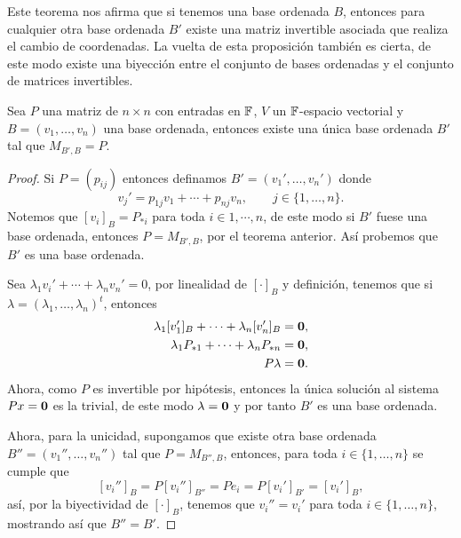 Este teorema nos afirma que si tenemos una base ordenada $B$, entonces para cualquier otra base ordenada $B'$ existe una matriz invertible asociada que realiza el cambio de coordenadas. La vuelta de esta proposición también es cierta, de este modo existe una biyección entre el conjunto de bases ordenadas y el conjunto de matrices invertibles.

\begin{prop}\label{prop:ExBase}
  Sea $P$ una matriz de $n\times n$ con entradas en $\mathbb{F}$, $V$ un $\mathbb{F}$-espacio vectorial y $B = (v_1, \ldots, v_n)$ una base ordenada, entonces existe una única base ordenada $B'$ tal que $M_{B',B} = P$.
\end{prop}
\begin{proof}
  Si $P = (p_{ij})$ entonces definamos $B' = (v_1', \ldots, v_n')$ donde
    \[ v_j' = p_{1j}v_1 + \cdots +  p_{nj}v_n,     \qquad j \in \{1,\ldots, n\}. \]
  Notemos que $[v_i]_B = P_{*i}$ para toda $i \in 1,\cdots,n$, de este modo si $B'$ fuese una base ordenada, entonces $P = M_{B',B}$, por el teorema anterior. Así probemos que $B'$ es una base ordenada.

  Sea $\lambda_1 v_i' + \cdots + \lambda_n v_n' = 0$, por linealidad de $[\cdot]_B$ y definición, tenemos que si $\lambda = (\lambda_1, \ldots, \lambda_n)^t$, entonces
  \begin{align*}
    \lambda_1 [v_1']_B + \cdots + \lambda_n [v_n']_B &= \mathbf{0} ,\\
    \lambda_1 P_{*1} + \cdots + \lambda_n P_{*n} &= \mathbf{0} ,\\
    P\lambda &= \mathbf{0}.
  \end{align*}
  Ahora, como $P$ es invertible por hipótesis, entonces la única solución al sistema $Px = \mathbf{0}$ es la trivial, de este modo $\lambda = \mathbf{0}$ y por tanto $B'$ es una base ordenada.

  Ahora, para la unicidad, supongamos que existe otra base ordenada $B'' = (v_1'', \ldots, v_n'')$ tal que $P = M_{B'',B}$, entonces, para toda $i \in \{1,\ldots,n\}$ se cumple que
  \[ [v_i'']_B =  P[v_i'']_{B''} = Pe_i = P[v_i']_{B'} = [v_i']_B, \]
  así, por la biyectividad de $[\cdot]_B$, tenemos que $v_i'' = v_i'$ para toda $i \in \{1,\ldots,n\}$, mostrando así que $B'' = B'$.
\end{proof}
